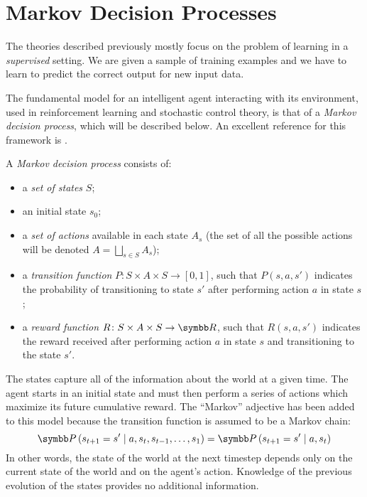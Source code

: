 \section{Markov Decision Processes}

The theories described previously mostly focus on the problem of learning in a \emph{supervised} setting. We are given a sample of training examples and we have to learn to predict the correct output for new input data.

The fundamental model for an intelligent agent interacting with its environment, used in reinforcement learning and stochastic control theory, is that of a \emph{Markov decision process}, which will be described below. An excellent reference for this framework is \cite{RusselNorvig2020}.

\begin{definition}
A \emph{Markov decision process} consists of:
\begin{itemize}
    \item a \emph{set of states} \(S\);
    \item an initial state \(s_0\);
    \item a \emph{set of actions} available in each state \(A_s\) (the set of all the possible actions will be denoted \(A = \bigsqcup_{s \in S} A_s\));
    \item a \emph{transition function} \(P \colon S \times A \times S \to [0, 1]\), such that \(P (s, a, s')\) indicates the probability of transitioning to state \(s'\) after performing action \(a\) in state \(s\);
    \item a \emph{reward function} \(R \colon S \times A \times S \to \reals\), such that \(R (s, a, s')\) indicates the reward received after performing action \(a\) in state \(s\) and transitioning to the state \(s'\).
\end{itemize}
\end{definition}

The states capture all of the information about the world at a given time. The agent starts in an initial state and must then perform a series of actions which maximize its future cumulative reward. The ``Markov'' adjective has been added to this model because the transition function is assumed to be a Markov chain:
\[
    \probability\given{s_{t + 1} = s'}{a, s_t, s_{t-1}, \dots, s_{1}} = \probability\given{s_{t + 1} = s'}{a, s_t}
\]
In other words, the state of the world at the next timestep depends only on the current state of the world and on the agent's action. Knowledge of the previous evolution of the states provides no additional information.

